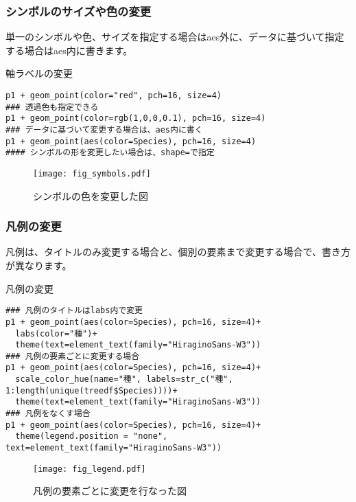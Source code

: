     \subsubsection{シンボルのサイズや色の変更}
単一のシンボルや色、サイズを指定する場合はaes外に、データに基づいて指定する場合はaes内に書きます。
\begin{itembox}[l]{軸ラベルの変更}
\begin{verbatim}
p1 + geom_point(color="red", pch=16, size=4)
### 透過色も指定できる
p1 + geom_point(color=rgb(1,0,0,0.1), pch=16, size=4)
### データに基づいて変更する場合は、aes内に書く
p1 + geom_point(aes(color=Species), pch=16, size=4)
#### シンボルの形を変更したい場合は、shape=で指定
\end{verbatim}
\end{itembox}
\begin{figure}[htb]
\begin{center}
\graphicspath{{1_basic/figs/}}
\texttt{[image: fig\_symbols.pdf]}\\
\caption{シンボルの色を変更した図}
 \label{symbols}
\end{center}
\end{figure}

    \subsubsection{凡例の変更}
凡例は、タイトルのみ変更する場合と、個別の要素まで変更する場合で、書き方が異なります。
\begin{itembox}[l]{凡例の変更}
\begin{verbatim}
### 凡例のタイトルはlabs内で変更
p1 + geom_point(aes(color=Species), pch=16, size=4)+
  labs(color="種")+
  theme(text=element_text(family="HiraginoSans-W3"))
### 凡例の要素ごとに変更する場合
p1 + geom_point(aes(color=Species), pch=16, size=4)+
  scale_color_hue(name="種", labels=str_c("種", 1:length(unique(treedf$Species))))+
  theme(text=element_text(family="HiraginoSans-W3"))
### 凡例をなくす場合
p1 + geom_point(aes(color=Species), pch=16, size=4)+
  theme(legend.position = "none", text=element_text(family="HiraginoSans-W3"))
\end{verbatim}
\end{itembox}
\begin{figure}[htb]
\begin{center}
\graphicspath{{1_basic/figs/}}
\texttt{[image: fig\_legend.pdf]}\\
\caption{凡例の要素ごとに変更を行なった図}
 \label{legend}
\end{center}
\end{figure}

